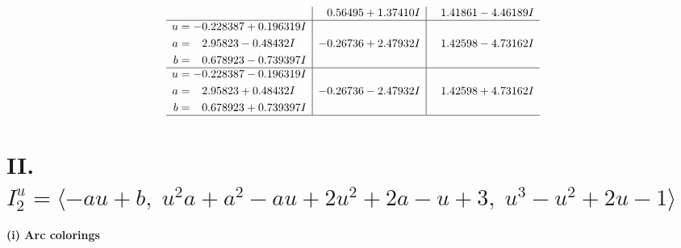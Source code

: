 \documentclass[1p]{elsarticle_modified}
\theoremstyle{definition}
\begin{document}
$$\begin{array}{c|c|c}
 & \phantom{-}0.56495 + 1.37410 I & \phantom{-}1.41861 - 4.46189 I \\ \hline\begin{aligned}
u &= -0.228387 + 0.196319 I \\
a &= \phantom{-}2.95823 - 0.48432 I \\
b &= \phantom{-}0.678923 - 0.739397 I\end{aligned}
 & -0.26736 + 2.47932 I & \phantom{-}1.42598 - 4.73162 I \\ \hline\begin{aligned}
u &= -0.228387 - 0.196319 I \\
a &= \phantom{-}2.95823 + 0.48432 I \\
b &= \phantom{-}0.678923 + 0.739397 I\end{aligned}
 & -0.26736 - 2.47932 I & \phantom{-}1.42598 + 4.73162 I\\
 \hline 
 \end{array}$$\newpage\newpage\renewcommand{\arraystretch}{1}
\centering \section*{II. $I^u_{2}= \langle - a u+b,\;u^2 a+a^2- a u+2 u^2+2 a- u+3,\;u^3- u^2+2 u-1 \rangle$}
\flushleft \textbf{(i) Arc colorings}\\
\end{document}
